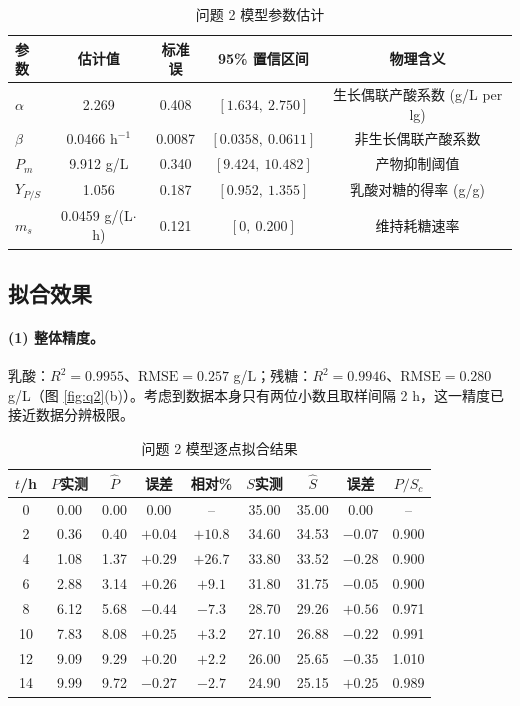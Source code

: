 \begin{table}[H]
\centering
\caption{问题 2 模型参数估计}
\label{tab:q2par}
\small
\begin{tabular}{lcccc}
\toprule
参数 & 估计值 & 标准误 & 95\% 置信区间 & 物理含义 \\
\midrule
$\alpha$ & 2.269 & 0.408 & $[1.634,\ 2.750]$ & 生长偶联产酸系数 (g/L per lg) \\
$\beta$  & 0.0466 $\mathrm{h^{-1}}$ & 0.0087 & $[0.0358,\ 0.0611]$ & 非生长偶联产酸系数 \\
$P_m$    & 9.912 g/L & 0.340 & $[9.424,\ 10.482]$ & 产物抑制阈值 \\
$Y_{P/S}$& 1.056 & 0.187 & $[0.952,\ 1.355]$ & 乳酸对糖的得率 (g/g) \\
$m_s$    & 0.0459 g/(L$\cdot$h) & 0.121 & $[0,\ 0.200]$ & 维持耗糖速率 \\
\bottomrule
\end{tabular}
\end{table}

\subsection{拟合效果}

\paragraph{(1) 整体精度。}乳酸：$R^2=0.9955$、$\mathrm{RMSE}=0.257$ g/L；残糖：$R^2=0.9946$、$\mathrm{RMSE}=0.280$ g/L（图 \ref{fig:q2}(b)）。考虑到数据本身只有两位小数且取样间隔 2 h，这一精度已接近数据分辨极限。

\begin{table}[H]
\centering
\caption{问题 2 模型逐点拟合结果}
\label{tab:q2point}
\small
\begin{tabular}{ccccccccc}
\toprule
$t$/h & $P$实测 & $\hat P$ & 误差 & 相对\% & $S$实测 & $\hat S$ & 误差 & $P/S_c$ \\
\midrule
0  & 0.00 & 0.00 & 0.00 & --  & 35.00 & 35.00 & 0.00 & -- \\
2  & 0.36 & 0.40 & $+0.04$ & $+10.8$ & 34.60 & 34.53 & $-0.07$ & 0.900 \\
4  & 1.08 & 1.37 & $+0.29$ & $+26.7$ & 33.80 & 33.52 & $-0.28$ & 0.900 \\
6  & 2.88 & 3.14 & $+0.26$ & $+9.1$  & 31.80 & 31.75 & $-0.05$ & 0.900 \\
8  & 6.12 & 5.68 & $-0.44$ & $-7.3$  & 28.70 & 29.26 & $+0.56$ & 0.971 \\
10 & 7.83 & 8.08 & $+0.25$ & $+3.2$  & 27.10 & 26.88 & $-0.22$ & 0.991 \\
12 & 9.09 & 9.29 & $+0.20$ & $+2.2$  & 26.00 & 25.65 & $-0.35$ & 1.010 \\
14 & 9.99 & 9.72 & $-0.27$ & $-2.7$  & 24.90 & 25.15 & $+0.25$ & 0.989 \\
\bottomrule
\end{tabular}
\end{table}

